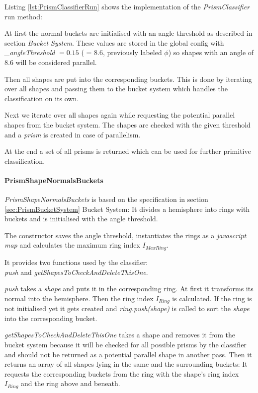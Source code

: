 \documentclass[../ClassicThesis.tex]{subfiles}
\begin{document}
Listing \ref{lst:PrismClassifierRun} shows the implementation of the \emph{PrismClassifier} run method:

At first the normal buckets are initialised with an angle threshold as described in section \emph{Bucket System}. These values are stored in the global config with \emph{\_angleThreshold} $ = 0.15 $  ( = 8.6\textdegree, previously labeled $\phi$) so shapes with an angle  of 8.6\textdegree \hspace{1pt} will be considered parallel.

Then all shapes are put into the corresponding buckets. This is done by iterating over all shapes and passing them to the bucket system which handles the classification on its own.

Next we iterate over all shapes again while requesting the potential parallel shapes from the bucket system. The shapes are checked with the given threshold and a \emph{prism} is created in case of parallelism.

At the end a set of all prisms is returned which can be used for further primitive classification.


\paragraph{PrismShapeNormalsBuckets}

\emph{PrismShapeNormalsBuckets} is based on the specification in section \ref{sec:PrismBucketSystem} Bucket System: It divides a hemisphere into rings with buckets and is initialised with the angle threshold.

The constructor saves the angle threshold, instantiates the rings as a \emph{javascript map} and calculates the maximum ring index $I_{MaxRing}$.

It provides two functions used by the classifier: \\
\emph{push} and \emph{getShapesToCheckAndDeleteThisOne}.

\emph{push} takes a \emph{shape} and puts it in the corresponding ring. At first it transforms its normal into the hemisphere. Then the ring index $ I_{Ring} $ is calculated. If the ring is not initialised yet it gets created and \emph{ring.push(shape)} is called to sort the \emph{shape} into the corresponding bucket.

\emph{getShapesToCheckAndDeleteThisOne} takes a shape and removes it from the bucket system because it will be checked for all possible prisms by the classifier and should not be returned as a potential parallel shape in another pass. Then it returns an array of all shapes lying in the same and the surrounding buckets: It requests the corresponding buckets from the ring with the shape's ring index $ I_{Ring} $ and the ring above and beneath.
\end{document}
